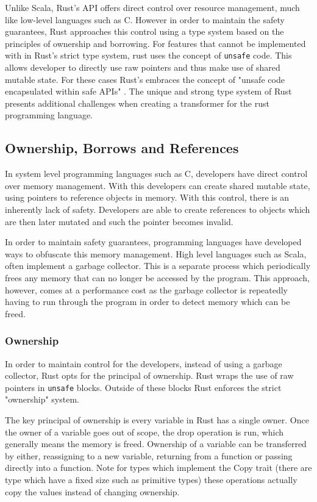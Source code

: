 \documentclass[ oneside,%
                    author={James Elgar},
                    degree={MEng},
                     title={Bidirectional transformer between functional and \\ object-oriented programming in Rust},
                  subtitle={}]{dissertation}
\newcommand{\rust}[1]{\texttt{#1}}
\begin{document}
Unlike Scala, Rust's API offers direct control over resource management, much like low-level languages such as C. However in order to maintain the safety guarantees, Rust approaches this control using a type system based on the principles of ownership and borrowing. For features that cannot be implemented with in Rust's strict type system, rust uses the concept of \rust{unsafe} code. This allows developer to directly use raw pointers and thus make use of shared mutable state. For these cases Rust's embraces the concept of "unsafe code encapsulated within safe APIs" \cite{rustsafesystems}.
The unique and strong type system of Rust presents additional challenges when creating a transformer for the rust programming language.

\subsection{Ownership, Borrows and References}

In system level programming languages such as C, developers have direct control over memory management. With this developers can create shared mutable state, using pointers to reference objects in memory. With this control, there is an inherently lack of safety. Developers are able to create references to objects which are then later mutated and such the pointer becomes invalid.

In order to maintain safety guarantees, programming languages have developed ways to obfuscate this memory management. High level languages such as Scala, often implement a garbage collector. This is a separate process which periodically frees any memory that can no longer be accessed by the program. This approach, however, comes at a performance cost as the garbage collector is repeatedly having to run through the program in order to detect memory which can be freed.

\subsubsection{Ownership}

In order to maintain control for the developers, instead of using a garbage collector, Rust opts for the principal of ownership. Rust wraps the use of raw pointers in \rust{unsafe} blocks. Outside of these blocks Rust enforces the strict "ownership" system.

The key principal of ownership is every variable in Rust has a single owner. Once the owner of a variable goes out of scope, the drop operation is run, which generally means the memory is freed. Ownership of a variable can be transferred by either, reassigning to a new variable, returning from a function or passing directly into a function. Note for types which implement the Copy trait (there are type which have a fixed size such as primitive types) these operations actually copy the values instead of changing ownership.
\end{document}
